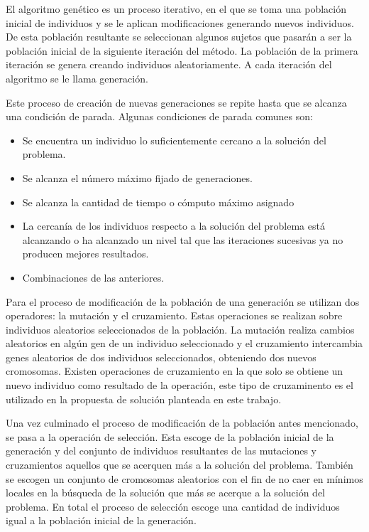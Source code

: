 El algoritmo genético es un proceso iterativo, en el que se toma una población inicial de individuos y se le aplican modificaciones generando nuevos individuos. De esta población resultante se seleccionan algunos sujetos que pasarán a ser la población inicial de la siguiente iteración del método. La población de la primera iteración se genera creando individuos aleatoriamente. A cada iteración del algoritmo se le llama generación.

Este proceso de creación de nuevas generaciones se repite hasta que se alcanza una condición de parada. Algunas condiciones de parada comunes son:

\begin{itemize}
    \item Se encuentra un individuo lo suficientemente cercano a la solución del problema.
    \item Se alcanza el número máximo fijado de generaciones.
    \item Se alcanza la cantidad de tiempo o cómputo máximo asignado
    \item La cercanía de los individuos respecto a la solución del problema está alcanzando o ha alcanzado un nivel tal que las iteraciones sucesivas ya no producen mejores resultados.
    \item Combinaciones de las anteriores.
\end{itemize}

Para el proceso de modificación de la población de una generación se utilizan dos operadores: la mutación y el cruzamiento. Estas operaciones se realizan sobre individuos aleatorios seleccionados de la población. La mutación realiza cambios aleatorios en algún gen de un individuo seleccionado y el cruzamiento intercambia genes aleatorios de dos individuos seleccionados, obteniendo dos nuevos cromosomas. Existen operaciones de cruzamiento en la que solo se obtiene un nuevo individuo como resultado de la operación, este tipo de cruzaminento es el utilizado en la propuesta de solución planteada en este trabajo.

Una vez culminado el proceso de modificación de la población antes mencionado, se pasa a la operación de selección. Esta escoge de la población inicial de la generación y del conjunto de individuos resultantes de las mutaciones y cruzamientos aquellos que se acerquen más a la solución del problema. También se escogen un conjunto de cromosomas aleatorios con el fin de no caer en mínimos locales en la búsqueda de la solución que más se acerque a la solución del problema. En total el proceso de selección escoge una cantidad de individuos igual a la población inicial de la generación.

